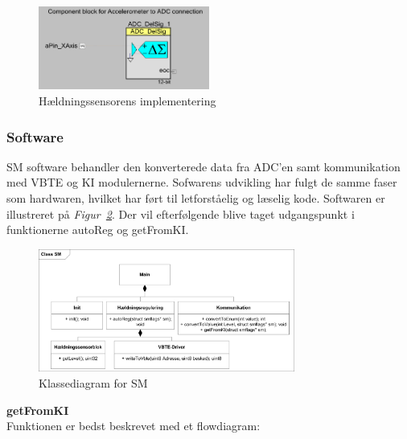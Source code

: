 \begin{figure}[htbp]
	\centering
	\includegraphics[width=0.50\textwidth]{billeder/levelsensor}
	\caption{Hældningssensorens implementering}
	\label{fig:levelsensor}
\end{figure}
\subsubsection{Software}
SM software behandler den konverterede data fra ADC'en samt kommunikation med VBTE og KI modulernerne. Sofwarens udvikling har fulgt de samme faser som hardwaren, hvilket har ført til letforståelig og læselig kode. Softwaren er illustreret på \textit{Figur~\ref{fig:SMKD}}. Der vil efterfølgende blive taget udgangspunkt i funktionerne autoReg og getFromKI.
\begin{figure}[H]
	\centering
	\includegraphics[width=0.75\textwidth]{billeder/smKlassediagram}
	\caption{Klassediagram for SM}
	\label{fig:SMKD}
\end{figure}
\textbf{getFromKI}\\
Funktionen er bedst beskrevet med et flowdiagram: